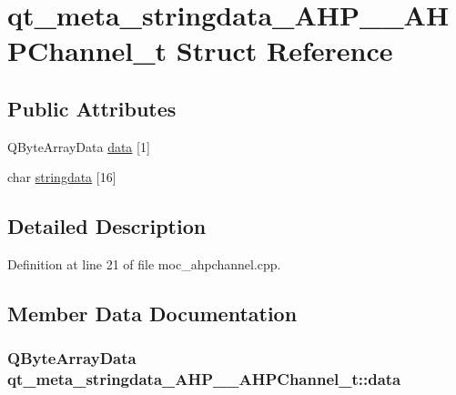 \hypertarget{structqt__meta__stringdata___a_h_p_____a_h_p_channel__t}{}\section{qt\+\_\+meta\+\_\+stringdata\+\_\+\+A\+H\+P\+\_\+\+\_\+\+A\+H\+P\+Channel\+\_\+t Struct Reference}
\label{structqt__meta__stringdata___a_h_p_____a_h_p_channel__t}
\subsection*{Public Attributes}
\begin{DoxyCompactItemize}
\item 
Q\+Byte\+Array\+Data \hyperlink{structqt__meta__stringdata___a_h_p_____a_h_p_channel__t_a6b5866a3dc39f3bc38fac5204e9c4885}{data} \mbox{[}1\mbox{]}
\item 
char \hyperlink{structqt__meta__stringdata___a_h_p_____a_h_p_channel__t_a211ab5f766a6915f0bf03a64c0691146}{stringdata} \mbox{[}16\mbox{]}
\end{DoxyCompactItemize}


\subsection{Detailed Description}


Definition at line 21 of file moc\+\_\+ahpchannel.\+cpp.



\subsection{Member Data Documentation}
\hypertarget{structqt__meta__stringdata___a_h_p_____a_h_p_channel__t_a6b5866a3dc39f3bc38fac5204e9c4885}{}
\subsubsection[{data}]{\setlength{\rightskip}{0pt plus 5cm}Q\+Byte\+Array\+Data qt\+\_\+meta\+\_\+stringdata\+\_\+\+A\+H\+P\+\_\+\+\_\+\+A\+H\+P\+Channel\+\_\+t\+::data}\label{structqt__meta__stringdata___a_h_p_____a_h_p_channel__t_a6b5866a3dc39f3bc38fac5204e9c4885}


